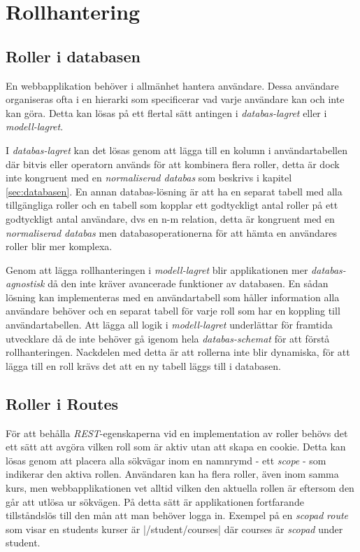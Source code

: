 \section{Rollhantering}

\subsection{Roller i databasen}

En webbapplikation behöver i allmänhet hantera användare. Dessa användare organiseras ofta i en hierarki som specificerar vad varje användare kan och inte kan göra. Detta kan lösas på ett flertal sätt antingen i \emph{databas-lagret} eller i \emph{modell-lagret}.

I \emph{databas-lagret} kan det lösas genom att lägga till en kolumn i användartabellen där bitvis eller 
operatorn används för att kombinera flera roller, detta är dock inte kongruent med en \emph{normaliserad databas} som beskrivs i kapitel \ref{sec:databasen}. En annan databas-lösning är att ha en separat tabell med alla tillgängliga roller och en tabell som kopplar ett godtyckligt antal roller på ett godtyckligt antal användare, dvs en n-m relation, detta är kongruent med en \emph{normaliserad databas} men databasoperationerna för att hämta en användares roller blir mer komplexa.

Genom att lägga rollhanteringen i \emph{modell-lagret} blir applikationen mer \emph{databas-agnostisk} då den inte kräver avancerade funktioner av databasen. En sådan lösning kan implementeras med en användartabell som håller information alla användare behöver och en separat tabell för varje roll som har en koppling till användartabellen. Att lägga all logik i \emph{modell-lagret} underlättar för framtida utvecklare då de inte behöver gå igenom hela \emph{databas-schemat} för att förstå rollhanteringen. Nackdelen med detta är att rollerna inte blir dynamiska, för att lägga till en roll krävs det att en ny tabell läggs till i databasen.

\subsection{Roller i Routes}

För att behålla \emph{REST}-egenskaperna vid en implementation av roller behövs det ett sätt att avgöra vilken roll som är aktiv utan att skapa en cookie. Detta kan lösas genom att placera alla sökvägar inom en namnrymd - ett \emph{scope} - som indikerar den aktiva rollen. Användaren kan ha flera roller, även inom samma kurs, men webbapplikationen vet alltid vilken den aktuella rollen är eftersom den går att utlösa ur sökvägen. På detta sätt är applikationen fortfarande tillståndslös till den mån att man behöver logga in.
Exempel på en \emph{scopad} \emph{route} som visar en students kurser är |/student/courses| där courses är \emph{scopad} under student.

